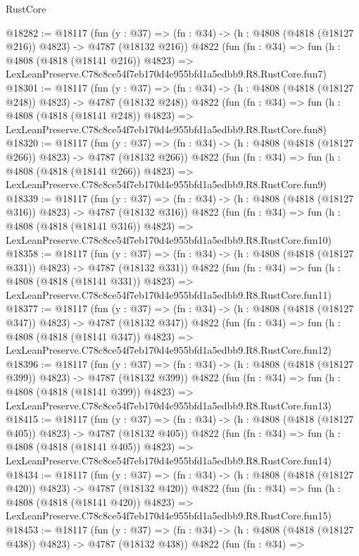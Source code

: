 \begin{lexlean}{RustCore}
\begin{coremodule}
@18282 := @18117
    (fun (y : @37) => (fn : @34) -> (h : @4808 (@4818 (@18127 @216)) @4823) -> @4787 (@18132 @216))
    @4822
    (fun (fn : @34) =>
    fun (h : @4808 (@4818 (@18141 @216)) @4823) =>
    LexLeanPreserve.C78c8ce54f7eb170d4e955bfd1a5edbb9.R8.RustCore.fun7)
@18301 := @18117
    (fun (y : @37) => (fn : @34) -> (h : @4808 (@4818 (@18127 @248)) @4823) -> @4787 (@18132 @248))
    @4822
    (fun (fn : @34) =>
    fun (h : @4808 (@4818 (@18141 @248)) @4823) =>
    LexLeanPreserve.C78c8ce54f7eb170d4e955bfd1a5edbb9.R8.RustCore.fun8)
@18320 := @18117
    (fun (y : @37) => (fn : @34) -> (h : @4808 (@4818 (@18127 @266)) @4823) -> @4787 (@18132 @266))
    @4822
    (fun (fn : @34) =>
    fun (h : @4808 (@4818 (@18141 @266)) @4823) =>
    LexLeanPreserve.C78c8ce54f7eb170d4e955bfd1a5edbb9.R8.RustCore.fun9)
@18339 := @18117
    (fun (y : @37) => (fn : @34) -> (h : @4808 (@4818 (@18127 @316)) @4823) -> @4787 (@18132 @316))
    @4822
    (fun (fn : @34) =>
    fun (h : @4808 (@4818 (@18141 @316)) @4823) =>
    LexLeanPreserve.C78c8ce54f7eb170d4e955bfd1a5edbb9.R8.RustCore.fun10)
@18358 := @18117
    (fun (y : @37) => (fn : @34) -> (h : @4808 (@4818 (@18127 @331)) @4823) -> @4787 (@18132 @331))
    @4822
    (fun (fn : @34) =>
    fun (h : @4808 (@4818 (@18141 @331)) @4823) =>
    LexLeanPreserve.C78c8ce54f7eb170d4e955bfd1a5edbb9.R8.RustCore.fun11)
@18377 := @18117
    (fun (y : @37) => (fn : @34) -> (h : @4808 (@4818 (@18127 @347)) @4823) -> @4787 (@18132 @347))
    @4822
    (fun (fn : @34) =>
    fun (h : @4808 (@4818 (@18141 @347)) @4823) =>
    LexLeanPreserve.C78c8ce54f7eb170d4e955bfd1a5edbb9.R8.RustCore.fun12)
@18396 := @18117
    (fun (y : @37) => (fn : @34) -> (h : @4808 (@4818 (@18127 @399)) @4823) -> @4787 (@18132 @399))
    @4822
    (fun (fn : @34) =>
    fun (h : @4808 (@4818 (@18141 @399)) @4823) =>
    LexLeanPreserve.C78c8ce54f7eb170d4e955bfd1a5edbb9.R8.RustCore.fun13)
@18415 := @18117
    (fun (y : @37) => (fn : @34) -> (h : @4808 (@4818 (@18127 @405)) @4823) -> @4787 (@18132 @405))
    @4822
    (fun (fn : @34) =>
    fun (h : @4808 (@4818 (@18141 @405)) @4823) =>
    LexLeanPreserve.C78c8ce54f7eb170d4e955bfd1a5edbb9.R8.RustCore.fun14)
@18434 := @18117
    (fun (y : @37) => (fn : @34) -> (h : @4808 (@4818 (@18127 @420)) @4823) -> @4787 (@18132 @420))
    @4822
    (fun (fn : @34) =>
    fun (h : @4808 (@4818 (@18141 @420)) @4823) =>
    LexLeanPreserve.C78c8ce54f7eb170d4e955bfd1a5edbb9.R8.RustCore.fun15)
@18453 := @18117
    (fun (y : @37) => (fn : @34) -> (h : @4808 (@4818 (@18127 @438)) @4823) -> @4787 (@18132 @438))
    @4822
    (fun (fn : @34) =>

\end{coremodule}
\end{lexlean}
